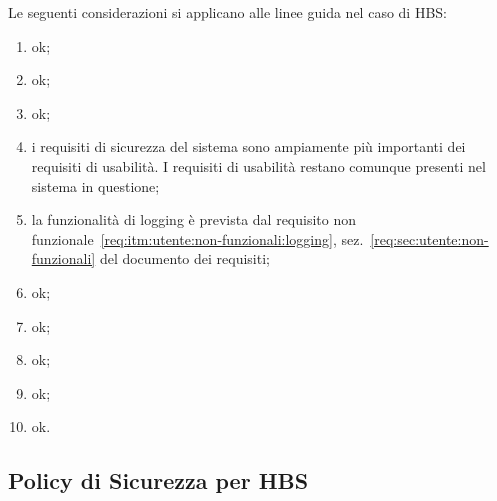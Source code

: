 Le seguenti considerazioni si applicano alle linee guida nel caso di HBS:
\begin{enumerate}
	\item ok;

	\item ok;

	\item ok;

	\item i requisiti di sicurezza del sistema sono ampiamente più importanti dei requisiti di usabilità.
	I requisiti di usabilità restano comunque presenti nel sistema in questione;

	\item la funzionalità di logging è prevista dal requisito non funzionale~\ref{req:itm:utente:non-funzionali:logging}, sez.~\ref{req:sec:utente:non-funzionali} del documento dei requisiti;

	\item ok;

	\item ok;

	\item ok;

	\item ok;

	\item ok.
\end{enumerate}

\subsection{Policy di Sicurezza per HBS}
